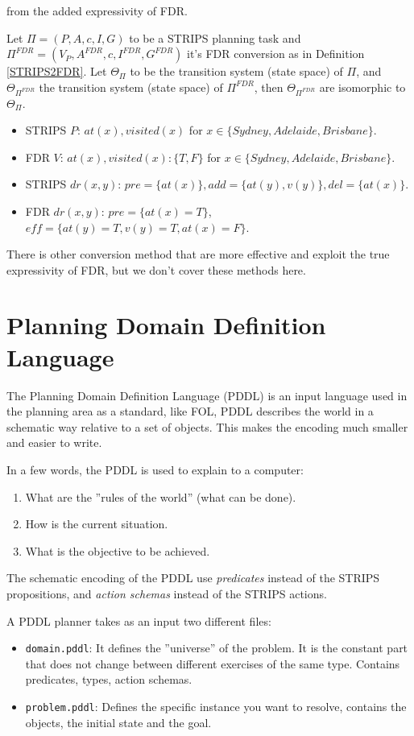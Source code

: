\documentclass[10pt, letterpaper]{report}
\begin{document}
 from the added expressivity of FDR.\begin{proposition}
    Let $\Pi=(P,A,c,I,G)$ to be a STRIPS planning task and\\  
    $\Pi^{FDR}=(V_P,A^{FDR},c,I^{FDR},G^{FDR})$ it's FDR conversion as in Definition \ref{STRIPS2FDR}. Let $\Theta_\Pi$ to be the transition system (state  space) of $\Pi$, and $\Theta_{\Pi^{FDR}}$ the transition system (state  space) of $\Pi^{FDR}$, then $\Theta_{\Pi^{FDR}}$ are isomorphic to $\Theta_\Pi$.
 \end{proposition}
 \begin{itemize}
    \item STRIPS $P$: $at(x), visited(x)$ for $x \in \{Sydney, Adelaide, Brisbane\}$.
    \item FDR $V$: $at(x), visited(x) : \{T, F\}$ for $x \in \{Sydney, Adelaide, Brisbane\}$.
    \item STRIPS $dr(x, y)$: $pre = \{at(x)\}, add = \{at(y), v(y)\}, del = \{at(x)\}$.
    \item FDR $dr(x, y)$: $pre = \{at(x) = T\}$, $eff = \{at(y) = T, v(y) = T, at(x) = F\}$.
\end{itemize}
There is other conversion method that are more effective and exploit the true expressivity of FDR, but we don't cover these methods here.

\section{Planning Domain Definition Language}
The Planning Domain Definition Language (PDDL) is an input language used in the planning area as a standard, like FOL, PDDL describes the world in a schematic way relative to a
 set of objects. This makes the encoding much smaller and easier to write.
 
In a few words, the PDDL is used to explain to a computer:\begin{enumerate}
\item What are the ''rules of the world'' (what can be done).
\item How is the current situation.
\item What is the objective to be achieved.
\end{enumerate}
The schematic encoding of the PDDL use \textit{predicates} instead of the STRIPS propositions, and \textit{action schemas} instead of the STRIPS actions.\bigskip

\noindent A PDDL planner takes as an input two different files:\begin{itemize}
    \item \texttt{domain.pddl}: It defines the ''universe'' of the problem. It is the constant part that does not change between different exercises of the same type. Contains predicates, types, action schemas.
    \item \texttt{problem.pddl}: Defines the specific instance you want to resolve, contains the objects, the initial state and the goal.
 \end{itemize}
\end{document}
